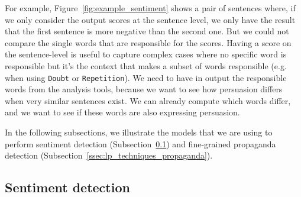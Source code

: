 For example, Figure~\ref{fig:example_sentiment} shows a pair of sentences where, if we only consider the output scores at the sentence level, we only have the result that the first sentence is more negative than the second one. But we could not compare the single words that are responsible for the scores.
Having a score on the sentence-level is useful to capture complex cases where no specific word is responsible but it's the context that makes a subset of words responsible (e.g. when using \texttt{Doubt} or \texttt{Repetition}). We need to have in output the responsible words from the analysis tools, because we want to see how persuasion differs when very similar sentences exist. We can already compute which words differ, and we want to see if these words are also expressing persuasion.

In the following subsections, we illustrate the models that we are using to perform sentiment detection (Subsection~\ref{ssec:lp_techniques_sentiment}) and fine-grained propaganda detection (Subsection~\ref{ssec:lp_techniques_propaganda}).


\subsection{\statusorange Sentiment detection}
\label{ssec:lp_techniques_sentiment}

